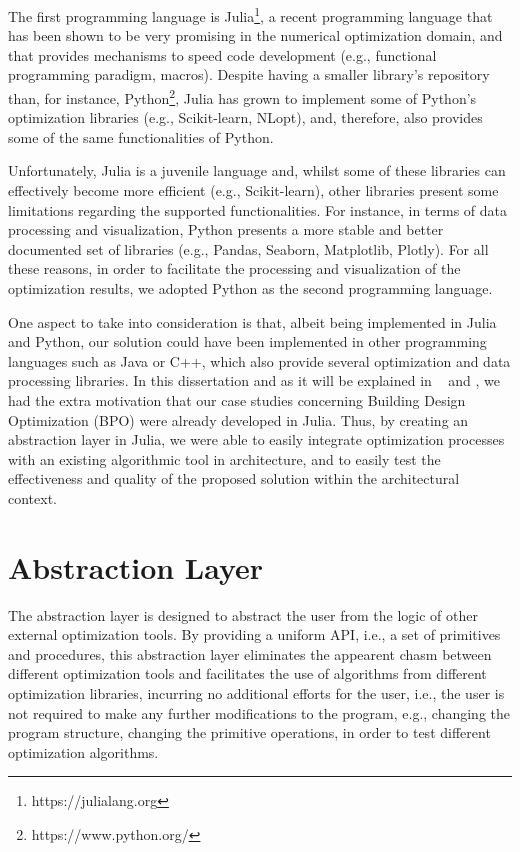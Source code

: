 The first programming language is Julia\footnote{https://julialang.org}, a recent programming language that has been shown to be very promising in the numerical optimization domain, and that provides mechanisms to speed code development (e.g., functional programming paradigm, macros). Despite having a smaller library's repository than, for instance, Python\footnote{https://www.python.org/}, Julia has grown to implement some of Python's optimization libraries (e.g., Scikit-learn, NLopt), and, therefore, also provides some of the same functionalities of Python.   

Unfortunately, Julia is a juvenile language and, whilst some of these libraries can effectively become more efficient (e.g., Scikit-learn), other libraries present some limitations regarding the supported functionalities. For instance, in terms of data processing and visualization, Python presents a more stable  and better documented set of libraries (e.g., Pandas, Seaborn, Matplotlib, Plotly). For all these reasons, in order to facilitate the processing and visualization of the optimization results, we adopted Python as the second programming language.


One aspect to take into consideration is that, albeit being implemented in Julia and Python, our solution could have been implemented in other programming languages such as Java or C++, which also provide several optimization and data processing libraries. In this dissertation and as it will be explained in ~ and , we had the extra motivation that our case studies concerning Building Design Optimization (BPO) were already developed in Julia. Thus, by creating an abstraction layer in Julia, we were able to easily integrate optimization processes with an existing algorithmic tool in architecture, and to easily test the effectiveness and quality of the proposed solution within the architectural context. 

\section{Abstraction Layer}

The abstraction layer is designed to abstract the user from the logic of other external optimization tools. By providing a uniform \ac{API}, i.e., a set of primitives and procedures, this abstraction layer eliminates the appearent chasm between different optimization tools and facilitates the use of algorithms from different optimization libraries, incurring no additional efforts for the user, i.e., the user is not required to make any further modifications to the program, e.g., changing the program structure, changing the primitive operations, in order to test different optimization algorithms. 

